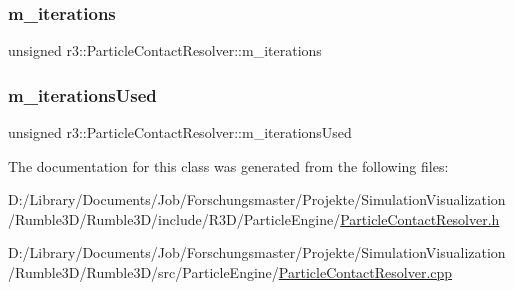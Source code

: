 \subsubsection{\texorpdfstring{m\+\_\+iterations}{m\_iterations}}
{\footnotesize\ttfamily unsigned r3\+::\+Particle\+Contact\+Resolver\+::m\+\_\+iterations\hspace{0.3cm}{\ttfamily [protected]}}

\mbox{\label{classr3_1_1_particle_contact_resolver_a07536069a9a6a73c45794baf8579b845}} 
\subsubsection{\texorpdfstring{m\+\_\+iterations\+Used}{m\_iterationsUsed}}
{\footnotesize\ttfamily unsigned r3\+::\+Particle\+Contact\+Resolver\+::m\+\_\+iterations\+Used\hspace{0.3cm}{\ttfamily [protected]}}



The documentation for this class was generated from the following files\+:\begin{DoxyCompactItemize}
\item 
D\+:/\+Library/\+Documents/\+Job/\+Forschungsmaster/\+Projekte/\+Simulation\+Visualization/\+Rumble3\+D/\+Rumble3\+D/include/\+R3\+D/\+Particle\+Engine/\mbox{\hyperlink{_particle_contact_resolver_8h}{Particle\+Contact\+Resolver.\+h}}\item 
D\+:/\+Library/\+Documents/\+Job/\+Forschungsmaster/\+Projekte/\+Simulation\+Visualization/\+Rumble3\+D/\+Rumble3\+D/src/\+Particle\+Engine/\mbox{\hyperlink{_particle_contact_resolver_8cpp}{Particle\+Contact\+Resolver.\+cpp}}\end{DoxyCompactItemize}
